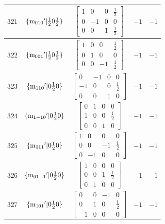 \documentclass[fleqn,8pt]{jsarticle}
\begin{document}
\begin{longtable}{ccccc}
$ 321 $ & $ \{{\rm m}_{010}{}'|\frac{1}{2} 0 \frac{1}{2}\} $ & $ \begin{bmatrix} 1 & 0 & 0 & \frac{1}{2} \\ 0 & -1 & 0 & 0 \\ 0 & 0 & 1 & \frac{1}{2} \end{bmatrix} $ & $ -1 $ & $ -1 $ \\ \hline
$ 322 $ & $ \{{\rm m}_{001}{}'|\frac{1}{2} 0 \frac{1}{2}\} $ & $ \begin{bmatrix} 1 & 0 & 0 & \frac{1}{2} \\ 0 & 1 & 0 & 0 \\ 0 & 0 & -1 & \frac{1}{2} \end{bmatrix} $ & $ -1 $ & $ -1 $ \\ \hline
$ 323 $ & $ \{{\rm m}_{110}{}'|0 \frac{1}{2} 0\} $ & $ \begin{bmatrix} 0 & -1 & 0 & 0 \\ -1 & 0 & 0 & \frac{1}{2} \\ 0 & 0 & 1 & 0 \end{bmatrix} $ & $ -1 $ & $ -1 $ \\ \hline
$ 324 $ & $ \{{\rm m}_{1-10}{}'|0 \frac{1}{2} 0\} $ & $ \begin{bmatrix} 0 & 1 & 0 & 0 \\ 1 & 0 & 0 & \frac{1}{2} \\ 0 & 0 & 1 & 0 \end{bmatrix} $ & $ -1 $ & $ -1 $ \\ \hline
$ 325 $ & $ \{{\rm m}_{011}{}'|0 \frac{1}{2} 0\} $ & $ \begin{bmatrix} 1 & 0 & 0 & 0 \\ 0 & 0 & -1 & \frac{1}{2} \\ 0 & -1 & 0 & 0 \end{bmatrix} $ & $ -1 $ & $ -1 $ \\ \hline
$ 326 $ & $ \{{\rm m}_{01-1}{}'|0 \frac{1}{2} 0\} $ & $ \begin{bmatrix} 1 & 0 & 0 & 0 \\ 0 & 0 & 1 & \frac{1}{2} \\ 0 & 1 & 0 & 0 \end{bmatrix} $ & $ -1 $ & $ -1 $ \\ \hline
$ 327 $ & $ \{{\rm m}_{101}{}'|0 \frac{1}{2} 0\} $ & $ \begin{bmatrix} 0 & 0 & -1 & 0 \\ 0 & 1 & 0 & \frac{1}{2} \\ -1 & 0 & 0 & 0 \end{bmatrix} $ & $ -1 $ & $ -1 $ \\ \hline

\end{longtable}
\end{document}
